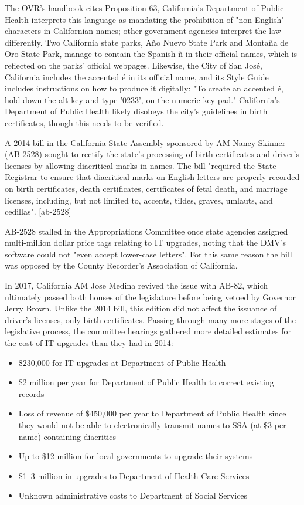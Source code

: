 The OVR's handbook cites Proposition 63, California's Department of Public
Health interprets this language as mandating the prohibition of "non-English"
characters in Californian names; other government agencies interpret the law
differently. Two California state parks, Año Nuevo State Park and Montaña de Oro
State Park, manage to contain the Spanish ñ in their official names, which is
reflected on the parks' official webpages. \parencite{año-nuevo}
\parencite{montaña-de-oro} Likewise, the City of San José, California includes
the accented é in its official name, and its Style Guide includes instructions
on how to produce it digitally: "To create an accented é, hold down the alt key
and type '0233'‚ on the numeric key pad." \textcite{san-josé} California's
Department of Public Health likely disobeys the city's guidelines in birth
certificates, though this needs to be verified.

A 2014 bill in the California State Assembly sponsored by AM Nancy Skinner
(AB-2528) sought to rectify the state's processing of birth certificates and
driver's licenses by allowing diacritical marks in names. The bill "required the
State Registrar to ensure that diacritical marks on English letters are properly
recorded on birth certificates, death certificates, certificates of fetal death,
and marriage licenses, including, but not limited to, accents, tildes, graves,
umlauts, and cedillas". [ab-2528]

AB-2528 stalled in the Appropriations Committee once state agencies assigned
multi-million dollar price tags relating to IT upgrades, noting that the DMV's
software could not "even accept lower-case letters". For this same reason the
bill was opposed by the County Recorder's Association of California.

In 2017, California AM Jose Medina revived the issue with AB-82, which
ultimately passed both houses of the legislature before being vetoed by Governor
Jerry Brown. Unlike the 2014 bill, this edition did not affect the issuance of
driver's licenses, only birth certificates. Passing through many more stages of
the legislative process, the committee hearings gathered more detailed estimates
for the cost of IT upgrades than they had in 2014:

\begin{itemize}

\item \$230,000 for IT upgrades at Department of Public Health
\item \$2 million per year for Department of Public Health to correct existing
records
\item Loss of revenue of \$450,000 per year to Department of Public Health since
they would not be able to electronically transmit names to SSA (at \$3 per name)
containing diacritics
\item Up to \$12 million for local governments to upgrade their systems
\item \$1--3 million in upgrades to Department of Health Care Services
\item Unknown administrative costs to Department of Social Services

\end{itemize}

